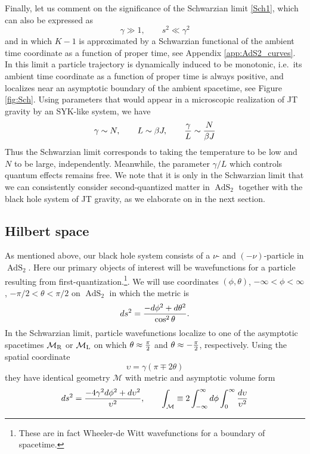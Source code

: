 \documentclass[12pt]{article}
\newcommand{\be}{\begin{equation}}
\newcommand{\ee}{\end{equation}}
\newcommand{\calM}{\mathcal{M}}
\DeclareMathOperator{\tAdS}{\widetilde{AdS}}
\newcommand{\bt}{\beta}
\newcommand{\tht}{\theta}
\newcommand{\ga}{\gamma}
\def\ie{i.e.\ }
\newcommand{\ov}{\over}
\def\widetilde#1{#1}%
\begin{document}
Finally, let us comment on the significance of the Schwarzian limit \eqref{Sch1}, which can also be expressed as 
\be \label{Sch2}
\ga \gg 1, \qquad s^2 \ll \ga^2
\ee
and in which $K-1$ is approximated by a Schwarzian functional of the ambient time coordinate as a function of proper time, see Appendix \ref{app:AdS2_curves}. In this limit a particle trajectory is dynamically induced to be monotonic, \ie its ambient time coordinate as a function of proper time is always positive, and localizes near an asymptotic boundary of the ambient spacetime, see Figure \ref{fig:Sch}. Using parameters that would appear in a microscopic realization of JT gravity by an SYK-like system, we have
\be \label{pmt}
\ga \sim N, \qquad L \sim \beta J , \qquad {\ga \ov L}\sim  {N \ov \bt J}
\ee
Thus the Schwarzian limit corresponds to taking the temperature to be low and $N$ to be large, independently. Meanwhile, the parameter $\ga/L$ which controls quantum effects remains free. We note that it is only in the Schwarzian limit that we can consistently consider second-quantized matter in $\tAdS_2$ together with the black hole system of JT gravity, as we elaborate on in the next section. 


\subsection{Hilbert space}

As mentioned above, our black hole system consists of a $\nu$- and $(-\nu)$-particle in $\tAdS_2$. Here our primary objects of interest will be wavefunctions for a particle resulting from first-quantization.\footnote{These are in fact Wheeler-de Witt wavefunctions for a boundary of spacetime.}. We will use coordinates $(\phi, \theta)$, $-\infty <\phi < \infty$, $-\pi/2 < \tht < \pi/2$ on $\tAdS_2$ in which the metric is
\be \label{AdSg}
ds^2={-d\phi^2 + d\tht^2 \ov \cos^2 \tht}.
\ee
In the Schwarzian limit, particle wavefunctions localize to one of the asymptotic spacetimes $\calM_{\rm R}$ or $\calM_{\rm L}$ on which $\tht \approx {\pi \ov 2}$ and $\tht \approx -{\pi \ov 2}$, respectively. Using the spatial coordinate 
\be \label{asymc}
\upsilon=\ga (\pi \mp 2 \tht)
\ee
they have identical geometry $\calM$ with metric and asymptotic volume form
\be \label{asymg}
ds^2= {-4\ga^2 d\phi^2 +d\upsilon^2 \ov \upsilon^2}, \qquad \int_{\calM}\equiv 2\int_{-\infty}^{\infty} d\phi \int_{0}^{\infty}{d\upsilon \ov \upsilon^2}
\ee
\end{document}
